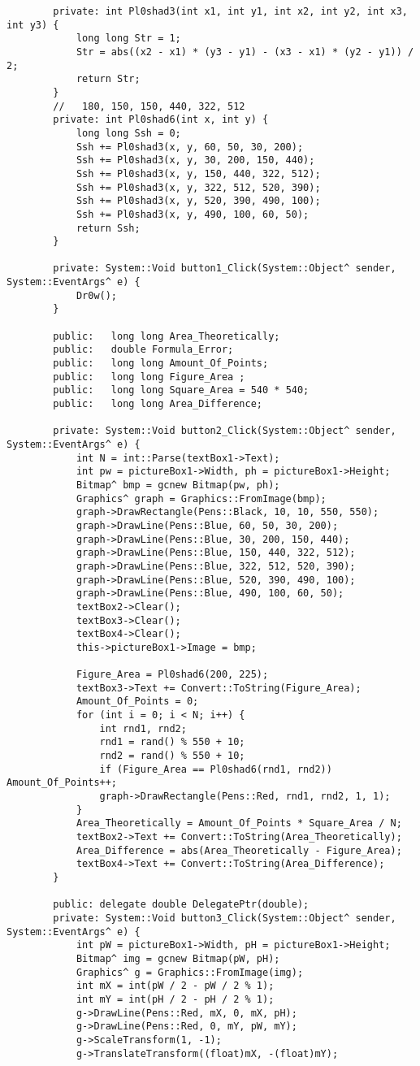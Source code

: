 \documentclass[a4paper,12pt]{article}
\begin{document}
\begin{verbatim}
		private: int Pl0shad3(int x1, int y1, int x2, int y2, int x3, int y3) {
			long long Str = 1;
			Str = abs((x2 - x1) * (y3 - y1) - (x3 - x1) * (y2 - y1)) / 2;
			return Str;
		}
		//   180, 150, 150, 440, 322, 512
		private: int Pl0shad6(int x, int y) {
			long long Ssh = 0;
			Ssh += Pl0shad3(x, y, 60, 50, 30, 200);
			Ssh += Pl0shad3(x, y, 30, 200, 150, 440);
			Ssh += Pl0shad3(x, y, 150, 440, 322, 512);
			Ssh += Pl0shad3(x, y, 322, 512, 520, 390);
			Ssh += Pl0shad3(x, y, 520, 390, 490, 100);
			Ssh += Pl0shad3(x, y, 490, 100, 60, 50);
			return Ssh;
		}
		
		private: System::Void button1_Click(System::Object^ sender, System::EventArgs^ e) {
			Dr0w();
		}
		
		public:	  long long Area_Theoretically;
		public:	  double Formula_Error;
		public:   long long Amount_Of_Points;
		public:   long long Figure_Area ;
		public:	  long long Square_Area = 540 * 540;
		public:	  long long Area_Difference;
		
		private: System::Void button2_Click(System::Object^ sender, System::EventArgs^ e) {
			int N = int::Parse(textBox1->Text);
			int pw = pictureBox1->Width, ph = pictureBox1->Height;
			Bitmap^ bmp = gcnew Bitmap(pw, ph);
			Graphics^ graph = Graphics::FromImage(bmp);
			graph->DrawRectangle(Pens::Black, 10, 10, 550, 550);
			graph->DrawLine(Pens::Blue, 60, 50, 30, 200);
			graph->DrawLine(Pens::Blue, 30, 200, 150, 440);
			graph->DrawLine(Pens::Blue, 150, 440, 322, 512);
			graph->DrawLine(Pens::Blue, 322, 512, 520, 390);
			graph->DrawLine(Pens::Blue, 520, 390, 490, 100);
			graph->DrawLine(Pens::Blue, 490, 100, 60, 50);
			textBox2->Clear();
			textBox3->Clear();
			textBox4->Clear();
			this->pictureBox1->Image = bmp;
			
			Figure_Area = Pl0shad6(200, 225);
			textBox3->Text += Convert::ToString(Figure_Area);
			Amount_Of_Points = 0;
			for (int i = 0; i < N; i++) {
				int rnd1, rnd2;
				rnd1 = rand() % 550 + 10;
				rnd2 = rand() % 550 + 10;
				if (Figure_Area == Pl0shad6(rnd1, rnd2)) Amount_Of_Points++;
				graph->DrawRectangle(Pens::Red, rnd1, rnd2, 1, 1);
			}
			Area_Theoretically = Amount_Of_Points * Square_Area / N;
			textBox2->Text += Convert::ToString(Area_Theoretically);
			Area_Difference = abs(Area_Theoretically - Figure_Area);
			textBox4->Text += Convert::ToString(Area_Difference);
		}
		
		public: delegate double DelegatePtr(double); 
		private: System::Void button3_Click(System::Object^ sender, System::EventArgs^ e) {
			int pW = pictureBox1->Width, pH = pictureBox1->Height;
			Bitmap^ img = gcnew Bitmap(pW, pH);
			Graphics^ g = Graphics::FromImage(img);
			int mX = int(pW / 2 - pW / 2 % 1);
			int mY = int(pH / 2 - pH / 2 % 1);
			g->DrawLine(Pens::Red, mX, 0, mX, pH);
			g->DrawLine(Pens::Red, 0, mY, pW, mY);
			g->ScaleTransform(1, -1);
			g->TranslateTransform((float)mX, -(float)mY); 
			

\end{verbatim}
\end{document}
